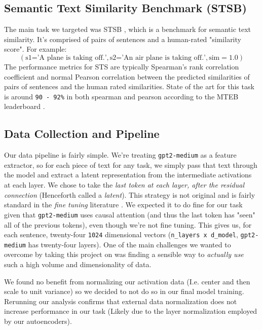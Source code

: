 \documentclass{article}
\begin{document}
\subsection{Semantic Text Similarity Benchmark (STSB)} \label{STS-section}
The main task we targeted was STSB \cite{STS}, which is a benchmark for semantic text similarity. It's comprised of pairs of sentences and a human-rated "similarity score". For example:
$$
(\text{s1='A plane is taking off.'}, \text{s2='An air plane is taking off.'}, \text{sim}=1.0)
$$
The performance metrics for STS are typically Spearman's rank correlation coefficient and normal Pearson correlation between the predicted similarities of pairs of sentences and the human rated similarities. State of the art for this task is around \verb|90 - 92%| in both spearman and pearson according to the MTEB leaderboard \cite{muennighoff2022mteb}.

\subsection{Data Collection and Pipeline} \label{latent}
Our data pipeline is fairly simple. We're treating \verb|gpt2-medium| as a feature extractor, so for each piece of text for any task, we simply pass that text through the model and extract a latent representation from the intermediate activations at each layer. We chose to take the \textit{last token at each layer, after the residual connection} (Henceforth called a \textit{latent}). This strategy is not original and is fairly standard in the \textit{fine tuning} literature \cite{LLMEmbed}. We expected it to do fine for our task given that \verb|gpt2-medium| uses causal attention (and thus the last token has "seen" all of the previous tokens), even though we're not fine tuning. This gives us, for each sentence, twenty-four \verb|1024| dimensional vectors (\verb|n_layers x d_model|, \verb|gpt2-medium| has twenty-four layers). One of the main challenges we wanted to overcome by taking this project on was finding a sensible way to \textit{actually use} such a high volume and dimensionality of data.

We found no benefit from normalizing our activation data (I.e. center and then scale to unit variance) so we decided to not do so in our final model training. Rerunning our analysis confirms that external data normalization does not increase performance in our task (Likely due to the layer normalization employed by our autoencoders).
\end{document}
